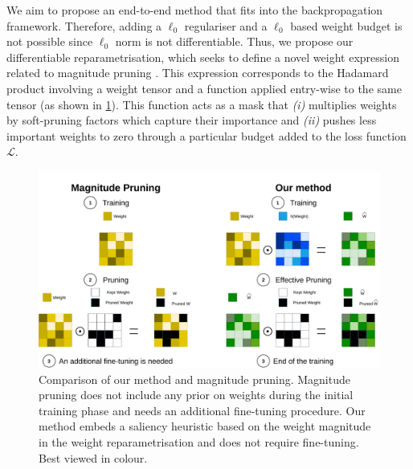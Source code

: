 We aim to propose an end-to-end method that fits into the backpropagation
framework. Therefore, adding a $\ell_0$ regulariser and a $\ell_0$ based weight budget
is not possible since $\ell_0$ norm is not differentiable. Thus, we propose our
differentiable reparametrisation, which seeks to define a novel weight
expression related to magnitude pruning
\cite{DBLP:conf/nips/CunDS89,DBLP:conf/nips/HanPTD15}. This expression
corresponds to the Hadamard product involving a weight tensor and a function
applied entry-wise to the same tensor (as shown in
\cref{fig:chap1:comparison_reparam_vs_mag_pruning}). This function acts as a
mask that \emph{(i)} multiplies weights by soft-pruning factors which capture their
importance and \emph{(ii)} pushes less important weights to zero through a particular
budget added to the loss function $\mathcal{L}$. \\

\begin{figure}[ht]
  \centerline{\includegraphics[width=12.5cm]{chapter_1/assets/comparison_reparam_vs_mag_pruning.pdf}}
  \caption{Comparison of our method and magnitude pruning. Magnitude pruning
    does not include any prior on weights during the initial training phase and
    needs an additional fine-tuning procedure. Our method embeds a saliency
    heuristic based on the weight magnitude in the weight reparametrisation and
    does not require fine-tuning. Best viewed in colour.}
  \label{fig:chap1:comparison_reparam_vs_mag_pruning}
\end{figure}


